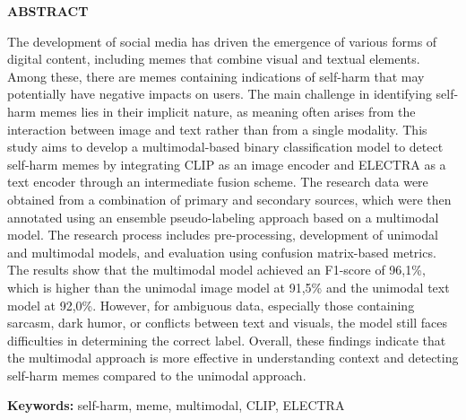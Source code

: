 \clearpage
{}%
\thispagestyle{fancy}

\begin{center}
	\large \bfseries \MakeUppercase{Abstract}\\
	\bigskip
	
	\normalsize \normalfont \justifying \singlespacing
	The development of social media has driven the emergence of various forms of digital content, including memes that combine visual and textual elements. Among these, there are memes containing indications of self-harm that may potentially have negative impacts on users. The main challenge in identifying self-harm memes lies in their implicit nature, as meaning often arises from the interaction between image and text rather than from a single modality. This study aims to develop a multimodal-based binary classification model to detect self-harm memes by integrating CLIP as an image encoder and ELECTRA as a text encoder through an intermediate fusion scheme. The research data were obtained from a combination of primary and secondary sources, which were then annotated using an ensemble pseudo-labeling approach based on a multimodal model. The research process includes pre-processing, development of unimodal and multimodal models, and evaluation using confusion matrix-based metrics. The results show that the multimodal model achieved an F1-score of 96,1\%, which is higher than the unimodal image model at 91,5\% and the unimodal text model at 92,0\%. However, for ambiguous data, especially those containing sarcasm, dark humor, or conflicts between text and visuals, the model still faces difficulties in determining the correct label. Overall, these findings indicate that the multimodal approach is more effective in understanding context and detecting self-harm memes compared to the unimodal approach.\par

    \vspace{20pt}
	\raggedright \textbf{Keywords:} self-harm, meme, multimodal, CLIP, ELECTRA
	
	\vfill
	
\end{center}
\clearpage